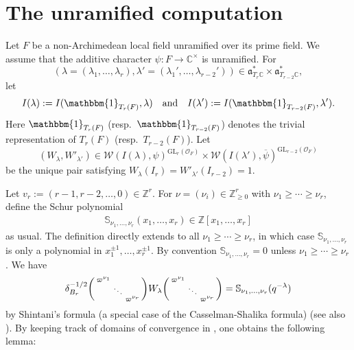 \documentclass[12pt]{amsart}
\theoremstyle{remark}
\numberwithin{equation}{section}
\newcommand{\GL}{\mathrm{GL}}
\newcommand{\ZZ}{\mathbb{Z}}
\newcommand{\OO}{\mathcal{O}}
\newcommand{\CC}{\mathbb{C}}
\theoremstyle{definition}
\newenvironment{psmatrix}
  {\left(\begin{smallmatrix}}
  {\end{smallmatrix}\right)}
\renewcommand{\bar}{\overline}
\numberwithin{equation}{subsection}
\newcommand{\one}{\mathbbm{1}}
\begin{document}
\section{The unramified computation}\label{sec:unramified}
Let $F$ be a non-Archimedean local field unramified over its prime field.  We assume that the additive character $\psi:F \to \CC^\times$  is unramified.  
For $$(\lambda=(\lambda_1,\dots,\lambda_r),\lambda'=(\lambda_1',\dots,\lambda_{r-2}')) \in \mathfrak{a}_{T_r\CC}^* \times \mathfrak{a}_{T_{r-2}\CC}^*,$$ let
$$
I(\lambda):=I(\one_{T_r(F)},\lambda) \quad\textrm{and}\quad I(\lambda'):=I(\one_{T_{r-2}(F)},\lambda').
$$
Here $\one_{T_r(F)}$ (resp.~$\one_{T_{r-2}(F)}$) denotes the trivial representation of $T_r(F)$ (resp.~$T_{r-2}(F)$).   Let $$(W_\lambda,W'_{\lambda'}) \in \mathcal{W}(I(\lambda),\psi)^{\GL_{r}(\OO_F)} \times \mathcal{W}(I(\lambda'),\bar{\psi})^{\GL_{r-2}(\OO_F)}$$be the unique pair satisfying $W_{\lambda}(I_{r})=W'_{\lambda'}(I_{r-2})=1.$  

 Let $v_{r}:=(r-1,r-2,\ldots, 0) \in \ZZ^r$. For $\nu=(\nu_i)\in \ZZ_{\ge 0}^r$ with $\nu_1 \geq \cdots \geq \nu_r$, define the Schur polynomial
\begin{align*} 
    \mathbb{S}_{\nu_1, \dots, \nu_r}(x_1,\dots,x_r) \in \ZZ[x_1,\dots,x_r]
\end{align*}
as usual.
 The definition directly extends to all $\nu_1 \geq \cdots \geq \nu_r$, in which case $\mathbb{S}_{\nu_1, \dots, \nu_r}$ is only a polynomial in $x_1^{\pm 1},\ldots, x_r^{\pm 1}$. By convention $\mathbb{S}_{\nu_1, \dots, \nu_r}=0$ unless $\nu_1 \geq \cdots \geq \nu_r$. We have
\begin{align} \label{CS}
\delta^{-1/2}_{B_{r}}\begin{psmatrix}\varpi^{\nu_1} & & \\ & \ddots & \\ & & \varpi^{\nu_r} \end{psmatrix}W_{\lambda}\begin{psmatrix}\varpi^{\nu_1} & & \\ & \ddots & \\ & & \varpi^{\nu_{r}} \end{psmatrix}=\mathbb{S}_{\nu_1,\dots,\nu_{r}}(q^{-\lambda})
\end{align}
by Shintani's formula (a special case of the Casselman-Shalika formula) \cite{ShintaniWhittaker} (see also \cite[\S 3.1.3]{CogdellPCMI}).  By keeping track of domains of convergence in \cite[Lemma 6.1]{GGHL}, one obtains the following lemma:
\end{document}
